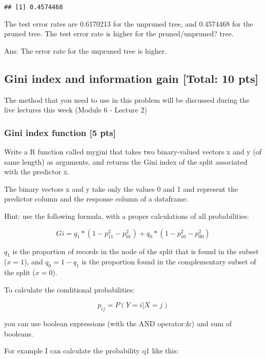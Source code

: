 \documentclass[
]{article}
\begin{document}
\begin{verbatim}
## [1] 0.4574468
\end{verbatim}

The test error rates are 0.6170213 for the unpruned tree, and 0.4574468
for the pruned tree. The test error rate is higher for the
pruned/unpruned? tree.

Ans: The error rate for the unpruned tree is higher.

\newpage

\hypertarget{gini-index-and-information-gain-total-10-pts}{%
\subsection{Gini index and information gain {[}Total: 10
pts{]}}\label{gini-index-and-information-gain-total-10-pts}}

The method that you need to use in this problem will be discussed during
the live lectures this week (Module 6 - Lecture 2)

\hypertarget{gini-index-function-5-pts}{%
\subsubsection{Gini index function {[}5
pts{]}}\label{gini-index-function-5-pts}}

Write a R function called mygini that takes two binary-valued vectors x
and y (of same length) as arguments, and returns the Gini index of the
split associated with the predictor x.

The binary vectors x and y take only the values 0 and 1 and represent
the predictor column and the response column of a dataframe.

Hint: use the following formula, with a proper calculations of all
probabilities:

\[Gi =q_1*(1-p_{11}^2-p_{01}^2)+q_0*(1-p_{10}^2-p_{00}^2)\]

\(q_1\) is the proportion of records in the node of the split that is
found in the subset (\(x=1\)), and \(q_0=1-q_1\) is the proportion found
in the complementary subset of the split (\(x=0\)).

To calculate the conditional probabilities:

\[ p_{ij}=P(Y=i|X=j)\]

you can use boolean expressions (with the AND operator:\&) and sum of
booleans.

For example I can calculate the probability q1 like this:
\end{document}
